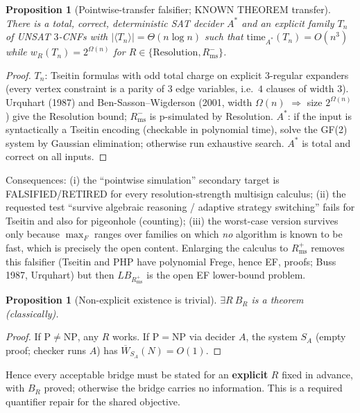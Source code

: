 \documentclass[11pt]{article}
\newtheorem{proposition}[theorem]{Proposition}
\newcommand{\Wb}{\overline W}
\begin{document}
\begin{proposition}[Pointwise-transfer falsifier; KNOWN THEOREM transfer]\label{prop:tseitin}
There is a total, correct, deterministic SAT decider $A^\ast$ and an explicit family $T_n$ of UNSAT
$3$-CNFs with $|\langle T_n\rangle|=\Theta(n\log n)$ such that
$\mathrm{time}_{A^\ast}(T_n)=O(n^3)$ while $w_{R}(T_n)=2^{\Omega(n)}$ for $R\in\{\text{Resolution}, R_{\mathrm{ms}}^{-}\}$.
\end{proposition}
\begin{proof}
$T_n$: Tseitin formulas with odd total charge on explicit $3$-regular expanders (every vertex
constraint is a parity of $3$ edge variables, i.e.\ $4$ clauses of width $3$).
Urquhart (1987) and Ben-Sasson--Wigderson (2001, width $\Omega(n)$ $\Rightarrow$ size $2^{\Omega(n)}$)
give the Resolution bound; $R_{\mathrm{ms}}^{-}$ is p-simulated by Resolution. $A^\ast$: if the input
is syntactically a Tseitin encoding (checkable in polynomial time), solve the GF(2) system by Gaussian
elimination; otherwise run exhaustive search. $A^\ast$ is total and correct on all inputs.
\end{proof}
Consequences: (i) the ``pointwise simulation'' secondary target is FALSIFIED/RETIRED for every
resolution-strength multisign calculus; (ii) the requested test ``survive algebraic reasoning / adaptive
strategy switching'' fails for Tseitin and also for pigeonhole (counting); (iii) the worst-case version
survives only because $\max_F$ ranges over families on which \emph{no} algorithm is known to be fast,
which is precisely the open content. Enlarging the calculus to $R_{\mathrm{ms}}^{+}$ removes this
falsifier (Tseitin and PHP have polynomial Frege, hence EF, proofs; Buss 1987, Urquhart) but then
$LB_{R_{\mathrm{ms}}^{+}}$ is the open EF lower-bound problem.

\begin{proposition}[Non-explicit existence is trivial]\label{prop:exist}
$\exists R\ B_R$ is a theorem (classically).
\end{proposition}
\begin{proof}
If $\mathrm P\neq\mathrm{NP}$, any $R$ works. If $\mathrm P=\mathrm{NP}$ via decider $A$, the system
$S_A$ (empty proof; checker runs $A$) has $\Wb_{S_A}(N)=O(1)$.
\end{proof}
Hence every acceptable bridge must be stated for an \textbf{explicit} $R$ fixed in advance, with $B_R$
proved; otherwise the bridge carries no information. This is a required quantifier repair for the shared
objective.
\end{document}
